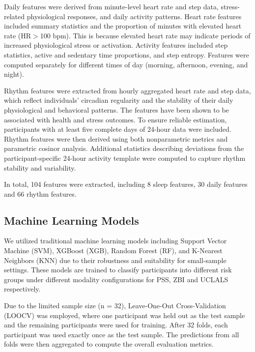 \documentclass[letterpaper, 10 pt, conference]{ieeeconf}  %
\begin{document}
Daily features were derived from minute-level heart rate and step data, stress-related physiological responses, and daily activity patterns. Heart rate features included summary statistics and the proportion of minutes with elevated heart rate (HR$>$100 bpm). This is because elevated heart rate may indicate periods of increased physiological stress or activation\cite{schneider2021life}. Activity features included step statistics, active and sedentary time proportions, and step entropy. Features were computed separately for different times of day (morning, afternoon, evening, and night).

Rhythm features were extracted from hourly aggregated heart rate and step data, which reflect individuals’ circadian regularity and the stability of their daily physiological and behavioral patterns\cite{smagula2022association}.  The features have been shown to be associated with health and stress outcomes\cite{relationshipZBI,smagula2022association,heartrate}. To ensure reliable estimation, participants with at least five complete days of 24-hour data were included. Rhythm features were then derived using both nonparametric metrics and parametric cosinor analysis. Additional statistics describing deviations from the participant-specific 24-hour activity template were computed to capture rhythm stability and variability. 

In total, 104 features were extracted, including  8 sleep features, 30 daily features and 66 rhythm features. 

\subsection{Machine Learning Models}
We utilized traditional machine learning models including Support Vector Machine (SVM)\cite{cortes1995support}, XGBoost (XGB)\cite{xgboost}, Random Forest (RF)\cite{rf}, and K-Nearest Neighbors (KNN)\cite{knn}  due to their robustness and suitability for small-sample settings. These models are trained to classify participants into different risk groups under different modality configurations for PSS, ZBI and UCLALS respectively. 

Due to the limited sample size (n = 32), Leave-One-Out Cross-Validation (LOOCV)\cite{loocv} was employed, where one participant was held out as the test sample and the remaining participants were used for training. After 32 folds, each participant was used exactly once as the test sample. The predictions from all folds were then aggregated to compute the overall evaluation metrics.
\end{document}
